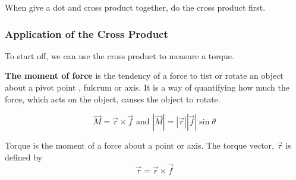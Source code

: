 \begin{remark}
    When give a dot and cross product together, do the cross product first. 
\end{remark}

\subsubsection{Application of the Cross Product}
To start off, we can use the cross product to measure a torque. 
\begin{definition}
    \textbf{The moment of force} is the tendency of a force to tist or rotate an object about a pivot point , fulcrum or axis.
    It is a way of quantifying how much the force, which acts on the object, causes the object to rotate. 

    $$\vec{M} = \vec{r} \times \vec{f} \text{ and } \left|\vec{M}\right| = \left|\vec{r}\right| \left|\vec{f}\right| \sin \theta$$
\end{definition}

Torque is the moment of a force about a point or axis. The torque vector, $\vec{\tau}$ is defined by 
$$\vec{\tau} = \vec{r} \times \vec{f}$$